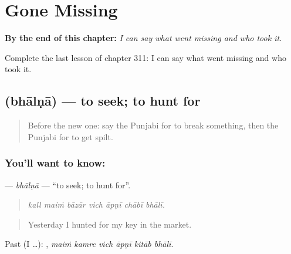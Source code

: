 
\chapter{Gone Missing}
\label{ch:pa-a2-gone-missing}

\begin{chapteropening}
\textbf{By the end of this chapter:} \emph{I can say what went missing and who took it.}

Complete the last lesson of chapter 311: I can say what went missing and who took it.
\end{chapteropening}

\section[\texorpdfstring{\pa{ਭਾਲਣਾ} (bhālṇā)}{ਭਾਲਣਾ (bhālṇā)}]{ (bhālṇā) — to seek; to hunt for}

\label{lesson:PA-C311-bhalna}



\begin{quote}
Before the new one: say the Punjabi for to break something, then the Punjabi for to get spilt.
\end{quote}

\subsection*{You'll want to know: }
\textbf{} — \emph{bhālṇā} — \textquotedblleft{}to seek; to hunt for\textquotedblright{}.

\begin{quote}
      
\end{quote}

\begin{quote}
\emph{kall maiṁ bāzār vich āpṇī chābī bhālī.}
\end{quote}

\begin{quote}
Yesterday I hunted for my key in the market.
\end{quote}

Past (I …):      , \emph{maiṁ kamre vich āpṇī kitāb bhālī}.

